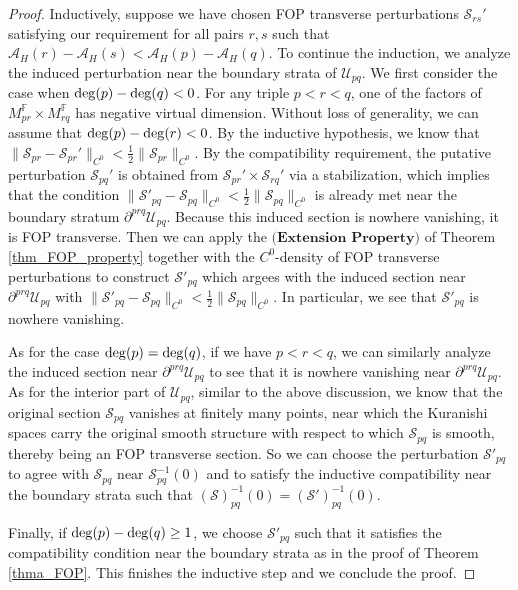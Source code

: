 \documentclass[reqno, 10pt]{amsart}
\numberwithin{equation}{section}
\numberwithin{equation}{section}
\theoremstyle{definition}
\theoremstyle{remark}
\newcommand{\mb}{\mathbb}
\newcommand{\mc}{\mathcal}
\begin{document}
\begin{proof}
Inductively, suppose we have chosen FOP transverse perturbations ${\mc S}_{rs}'$ satisfying our requirement for all pairs $r, s$ such that ${\mc A}_H(r) - {\mc A}_H(s) < {\mc A}_H(p) - {\mc A}_H(q)$. To continue the induction, we analyze the induced perturbation near the boundary strata of ${\mc U}_{pq}$. We first consider the case when ${\rm deg}(p) - {\rm deg}(q) <0$. For any triple $p<r<q$, one of the factors of $M_{pr}^{\mb F} \times M_{rq}^{\mb F} $ has negative virtual dimension. Without loss of generality, we can assume that ${\rm deg}(p) - {\rm deg}(r) <0$. By the inductive hypothesis, we know that $\| {\mc S}_{pr} - {\mc S}_{pr}' \|_{C^0} < \frac12 \| {\mc S}_{pr} \|_{C^0}$. By the compatibility requirement, the putative perturbation ${\mc S}_{pq}'$ is obtained from ${\mc S}_{pr}' \times {\mc S}_{rq}'$ via a stabilization, which implies that the condition $\| {\mc S}'_{pq} - {\mc S}_{pq} \|_{C^0} < \frac12 \| {\mc S}_{pq}\|_{C^0}$ is already met near the boundary stratum $\partial^{prq}{\mc U}_{pq}$. Because this induced section is nowhere vanishing, it is FOP transverse. Then we can apply the $\textbf{(Extension Property)}$ of Theorem \ref{thm_FOP_property} together with the $C^0$-density of FOP transverse perturbations to construct ${\mc S}'_{pq}$ which argees with the induced section near $\partial^{prq}{\mc U}_{pq}$ with $\| {\mc S}'_{pq} - {\mc S}_{pq} \|_{C^0} < \frac12 \| {\mc S}_{pq}\|_{C^0}$. In particular, we see that ${\mc S}'_{pq}$ is nowhere vanishing. 

As for the case ${\rm deg}(p) = {\rm deg}(q)$, if we have $p<r<q$, we can similarly analyze the induced section near $\partial^{prq}{\mc U}_{pq}$ to see that it is nowhere vanishing near $\partial^{prq}{\mc U}_{pq}$. As for the interior part of ${\mc U}_{pq}$, similar to the above discussion, we know that the original section ${\mc S}_{pq}$ vanishes at finitely many points, near which the Kuranishi spaces carry the original smooth structure with respect to which ${\mc S}_{pq}$ is smooth, thereby being an FOP transverse section. So we can choose the perturbation ${\mc S}'_{pq}$ to agree with ${\mc S}_{pq}$ near ${\mc S}^{-1}_{pq}(0)$ and to satisfy the inductive compatibility near the boundary strata such that $({\mc S})^{-1}_{pq}(0) = ({\mc S}')^{-1}_{pq}(0)$. 

Finally, if ${\rm deg}(p) - {\rm deg}(q) \geq 1$, we choose ${\mc S}'_{pq}$ such that it satisfies the compatibility condition near the boundary strata as in the proof of Theorem \ref{thma_FOP}. This finishes the inductive step and we conclude the proof.
\end{proof}
\end{document}
